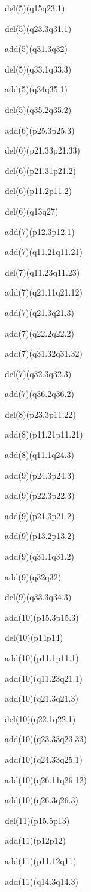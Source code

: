 \documentclass[]{article}
\begin{document}
del(5)(q15q23.1)

del(5)(q23.3q31.1)

add(5)(q31.3q32)

del(5)(q33.1q33.3)

add(5)(q34q35.1)

del(5)(q35.2q35.2)

add(6)(p25.3p25.3)

del(6)(p21.33p21.33)

del(6)(p21.31p21.2)

del(6)(p11.2p11.2)

del(6)(q13q27)

add(7)(p12.3p12.1)

add(7)(q11.21q11.21)

del(7)(q11.23q11.23)

add(7)(q21.11q21.12)

add(7)(q21.3q21.3)

add(7)(q22.2q22.2)

add(7)(q31.32q31.32)

del(7)(q32.3q32.3)

add(7)(q36.2q36.2)

del(8)(p23.3p11.22)

add(8)(p11.21p11.21)

add(8)(q11.1q24.3)

add(9)(p24.3p24.3)

add(9)(p22.3p22.3)

add(9)(p21.3p21.2)

add(9)(p13.2p13.2)

add(9)(q31.1q31.2)

add(9)(q32q32)

del(9)(q33.3q34.3)

add(10)(p15.3p15.3)

del(10)(p14p14)

add(10)(p11.1p11.1)

add(10)(q11.23q21.1)

add(10)(q21.3q21.3)

del(10)(q22.1q22.1)

add(10)(q23.33q23.33)

add(10)(q24.33q25.1)

add(10)(q26.11q26.12)

add(10)(q26.3q26.3)

del(11)(p15.5p13)

add(11)(p12p12)

add(11)(p11.12q11)

add(11)(q14.3q14.3)
\end{document}
